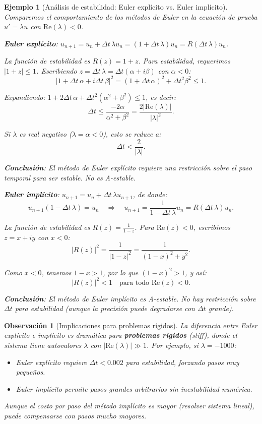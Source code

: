 \documentclass[a4paper,11pt]{report}
\newtheorem{example}[theorem]{Ejemplo}
\newtheorem{remark}[theorem]{Observación}
\begin{document}
\begin{example}[Análisis de estabilidad: Euler explícito vs. Euler implícito]
Comparemos el comportamiento de los métodos de Euler en la ecuación de prueba $u' = \lambda u$ con $\text{Re}(\lambda) < 0$.

\textbf{Euler explícito}: $u_{n+1} = u_n + \Delta t\,\lambda u_n = (1 + \Delta t\,\lambda) u_n = R(\Delta t\,\lambda) u_n$.

La función de estabilidad es $R(z) = 1 + z$. Para estabilidad, requerimos $|1 + z| \leq 1$. Escribiendo $z = \Delta t\,\lambda = \Delta t(\alpha + i\beta)$ con $\alpha < 0$:
\[
|1 + \Delta t\,\alpha + i\Delta t\,\beta|^2 = (1 + \Delta t\,\alpha)^2 + \Delta t^2\beta^2 \leq 1.
\]

Expandiendo: $1 + 2\Delta t\,\alpha + \Delta t^2(\alpha^2 + \beta^2) \leq 1$, es decir:
\[
\Delta t \leq \frac{-2\alpha}{\alpha^2 + \beta^2} = \frac{2|\text{Re}(\lambda)|}{|\lambda|^2}.
\]

Si $\lambda$ es real negativo ($\lambda = \alpha < 0$), esto se reduce a:
\[
\Delta t < \frac{2}{|\lambda|}.
\]

\textbf{Conclusión}: El método de Euler explícito requiere una \emph{restricción sobre el paso temporal} para ser estable. No es A-estable.

\textbf{Euler implícito}: $u_{n+1} = u_n + \Delta t\,\lambda u_{n+1}$, de donde:
\[
u_{n+1}(1 - \Delta t\,\lambda) = u_n \quad \Rightarrow \quad u_{n+1} = \frac{1}{1 - \Delta t\,\lambda} u_n = R(\Delta t\,\lambda) u_n.
\]

La función de estabilidad es $R(z) = \frac{1}{1 - z}$. Para $\text{Re}(z) < 0$, escribimos $z = x + iy$ con $x < 0$:
\[
|R(z)|^2 = \frac{1}{|1 - z|^2} = \frac{1}{(1-x)^2 + y^2}.
\]

Como $x < 0$, tenemos $1 - x > 1$, por lo que $(1-x)^2 > 1$, y así:
\[
|R(z)|^2 < 1 \quad \text{para todo } \text{Re}(z) < 0.
\]

\textbf{Conclusión}: El método de Euler implícito es A-estable. No hay restricción sobre $\Delta t$ para estabilidad (aunque la precisión puede degradarse con $\Delta t$ grande).
\end{example}

\begin{remark}[Implicaciones para problemas rígidos]
La diferencia entre Euler explícito e implícito es dramática para \textbf{problemas rígidos} (stiff), donde el sistema tiene autovalores $\lambda$ con $|\text{Re}(\lambda)| \gg 1$. Por ejemplo, si $\lambda = -1000$:
\begin{itemize}
    \item Euler explícito requiere $\Delta t < 0.002$ para estabilidad, forzando pasos muy pequeños.
    \item Euler implícito permite pasos grandes arbitrarios sin inestabilidad numérica.
\end{itemize}
Aunque el costo por paso del método implícito es mayor (resolver sistema lineal), puede compensarse con pasos mucho mayores.
\end{remark}
\end{document}

